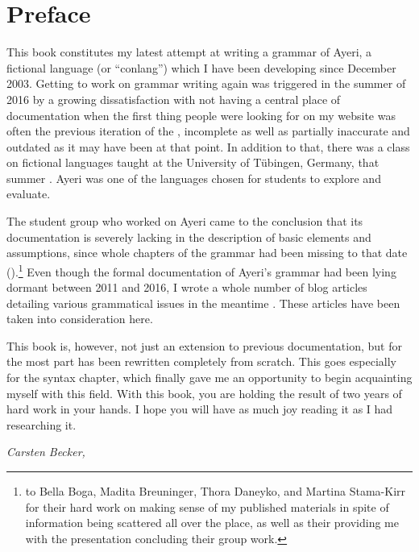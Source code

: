 \chapter{Preface}

This book constitutes my latest attempt at writing a grammar of Ayeri, a
fictional language (or \enquote{conlang}) which I have been developing since
December 2003. Getting to work on grammar writing again was triggered in the
summer of 2016 by a growing dissatisfaction with not having a central place of
documentation when the first thing people were looking for on my website was
often the previous iteration of the , incomplete as well as
partially inaccurate and outdated as it may have been at that point. In
addition to that, there was a class on fictional languages taught at the
University of Tübingen, Germany, that summer \autocite{buch2016ss}. Ayeri was
one of the languages chosen for students to explore and evaluate.

The student group who worked on Ayeri came to the conclusion that its
documentation is severely lacking in the description of basic elements and
assumptions, since whole chapters of the grammar had been missing to that date
(\cite[12]{boga2016}).\footnote{
to Bella Boga, Madita Breuninger, Thora Daneyko, and Martina Stama-Kirr for
their hard work on making sense of my published materials in spite of
information being scattered all over the place, as well as their providing me
with the presentation concluding their group work.} Even though the formal
documentation of Ayeri's grammar had been lying dormant between 2011 and 2016,
I wrote a whole number of blog articles detailing various grammatical issues in
the meantime \autocite[Blog]{benung}. These articles have been taken into
consideration here.

This book is, however, not just an extension to previous documentation, but for
the most part has been rewritten completely from scratch. This goes especially
for the syntax chapter, which finally gave me an opportunity to begin
acquainting myself with this field. With this book, you are holding the result
of two years of hard work in your hands. I hope you will have as much joy
reading it as I had researching it.

\begin{flushright}\itshape\footnotesize
{}
Carsten Becker,  \the\year
\end{flushright}